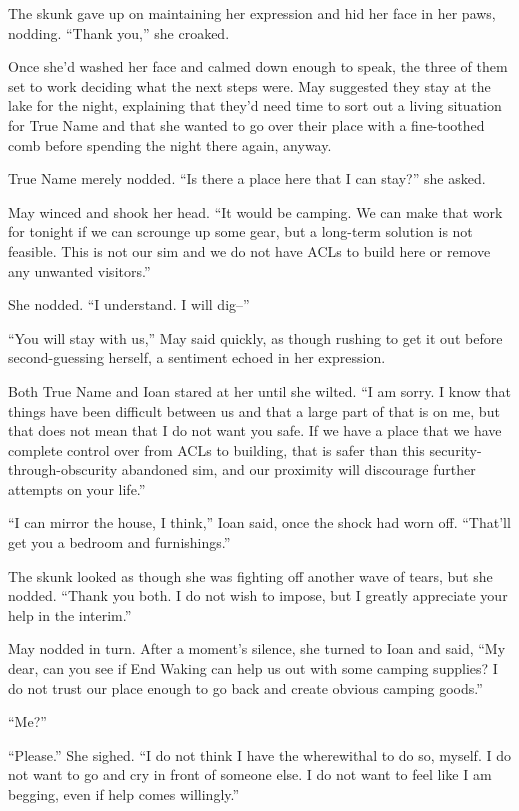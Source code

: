 The skunk gave up on maintaining her expression and hid her face in her paws, nodding. ``Thank you,'' she croaked.

Once she'd washed her face and calmed down enough to speak, the three of them set to work deciding what the next steps were. May suggested they stay at the lake for the night, explaining that they'd need time to sort out a living situation for True Name and that she wanted to go over their place with a fine-toothed comb before spending the night there again, anyway.

True Name merely nodded. ``Is there a place here that I can stay?'' she asked.

May winced and shook her head. ``It would be camping. We can make that work for tonight if we can scrounge up some gear, but a long-term solution is not feasible. This is not our sim and we do not have ACLs to build here or remove any unwanted visitors.''

She nodded. ``I understand. I will dig--''

``You will stay with us,'' May said quickly, as though rushing to get it out before second-guessing herself, a sentiment echoed in her expression.

Both True Name and Ioan stared at her until she wilted. ``I am sorry. I know that things have been difficult between us and that a large part of that is on me, but that does not mean that I do not want you safe. If we have a place that we have complete control over from ACLs to building, that is safer than this security-through-obscurity abandoned sim, and our proximity will discourage further attempts on your life.''

``I can mirror the house, I think,'' Ioan said, once the shock had worn off. ``That'll get you a bedroom and furnishings.''

The skunk looked as though she was fighting off another wave of tears, but she nodded. ``Thank you both. I do not wish to impose, but I greatly appreciate your help in the interim.''

May nodded in turn. After a moment's silence, she turned to Ioan and said, ``My dear, can you see if End Waking can help us out with some camping supplies? I do not trust our place enough to go back and create obvious camping goods.''

``Me?''

``Please.'' She sighed. ``I do not think I have the wherewithal to do so, myself. I do not want to go and cry in front of someone else. I do not want to feel like I am begging, even if help comes willingly.''

